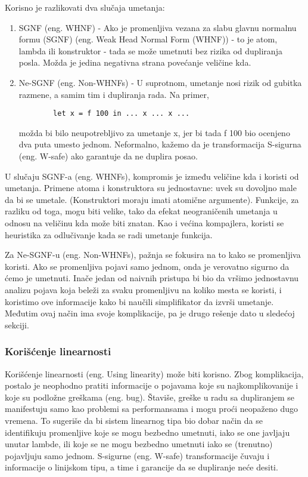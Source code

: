 Korisno je razlikovati dva slučaja umetanja:
\begin{enumerate}
	\item SGNF (eng. WHNF) - Ako je promenljiva vezana za slabu glavnu normalnu formu (SGNF) (eng. Weak Head Normal Form (WHNF)) - to 
	je atom, lambda ili konstruktor - tada se može umetnuti bez rizika od dupliranja posla. Možda je jedina negativna 
	strana povećanje veličine kda.
	\item Ne-SGNF (eng. Non-WHNFs) - U suprotnom, umetanje nosi rizik od gubitka razmene, a samim tim i dupliranja rada. Na primer,
		\begin{verbatim}
		let x = f 100 in ... x ... x ... 
		\end{verbatim}
	možda bi bilo neupotrebljivo za umetanje x, jer bi tada f 100 bio ocenjeno dva puta 
	umesto jednom. Neformalno, kažemo da je transformacija S-sigurna (eng. W-safe) ako garantuje da ne duplira posao.
\end{enumerate}

U slučaju SGNF-a (eng. WHNFs), kompromis je između veličine kda i koristi od umetanja. Primene atoma i konstruktora su 
jednostavne: uvek su dovoljno male da bi se umetale. (Konstruktori moraju imati atomične argumente). Funkcije, za 
razliku od toga, mogu biti velike, tako da efekat neograničenih umetanja u odnosu na veličinu kda može biti znatan. Kao i većina 
kompajlera, koristi se heuristika za odlučivanje kada se radi umetanje funkcija.

Za Ne-SGNF-u (eng. Non-WHNFs), pažnja se fokusira na to kako se promenljiva koristi. Ako se promenljiva 
pojavi samo jednom, onda je verovatno sigurno da ćemo je umetnuti. Inače jedan od naivnih pristupa bi bio da vršimo jednostavnu analizu pojava koja 
beleži za svaku promenljivu na koliko mesta se koristi, i koristimo ove informacije kako bi naučili simplifikator da izvrši umetanje. Međutim ovaj način ima svoje komplikacije, pa je drugo rešenje dato u sledećoj sekciji.

\subsubsection{Korišćenje linearnosti}
\label{sec:podpodnaslovLinearity}

Korišćenje linearnosti (eng. Using linearity) može biti korisno. Zbog komplikacija, postalo je neophodno pratiti informacije o pojavama koje su najkomplikovanije i koje su podložne greškama (eng. bug). Štaviše, 
greške u radu sa dupliranjem se manifestuju samo kao problemi sa performansama i mogu proći neopaženo dugo vremena. To sugeriše da bi sistem linearnog tipa bio dobar način da se identifikuju promenljive koje se mogu bezbedno umetnuti, iako se one javljaju unutar lambde, ili koje se ne mogu bezbedno umetnuti iako se (trenutno) pojavljuju samo jednom. S-sigurne (eng. W-safe) transformacije čuvaju i informacije o linijskom tipu, a time i garancije da se dupliranje neće desiti.

